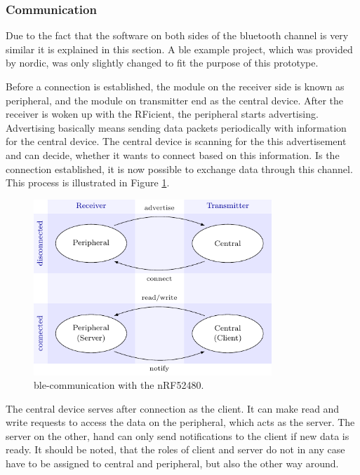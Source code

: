 \clearpage
\subsubsection{Communication}
Due to the fact that the software on both sides of the bluetooth channel is very similar it is explained in this section.
A \acs{ble} example project, which was provided by nordic, was only slightly changed to fit the purpose of this prototype.

Before a connection is established, the module on the receiver side is known as peripheral, and the module on transmitter end as the central device.
After the receiver is woken up with the RFicient, the peripheral starts advertising.
Advertising basically means sending data packets periodically with information for the central device.
The central device is scanning for the this advertisement and can decide, whether it wants to connect based on this information.
Is the connection established, it is now possible to exchange data through this channel.
This process is illustrated in Figure \ref{software:ble}.
\begin{figure}[ht]
	\centering
	\includegraphics[width=0.8\textwidth]{4-development/software/graphics/ble.pdf}
	\caption{\acs{ble}-communication with the nRF52480.\label{software:ble}}
\end{figure}

The central device serves after connection as the client.
It can make read and write requests to access the data on the peripheral, which acts as the server.
The server on the other, hand can only send notifications to the client if new data is ready.
It should be noted, that the roles of client and server do not in any case have to be assigned to central and peripheral, but also the other way around. 

